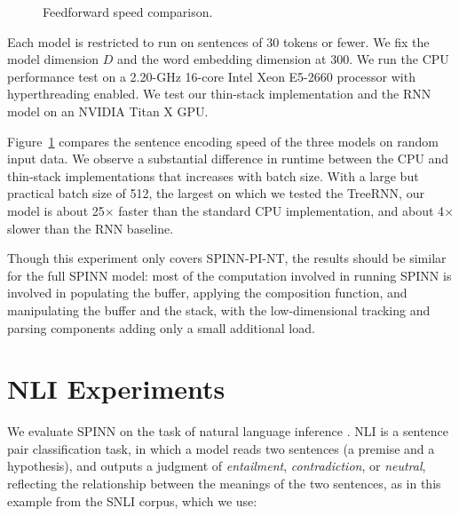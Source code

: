 \documentclass[11pt]{article}
\begin{document}
\begin{figure}
\centering
{}
\caption{Feedforward speed comparison.}
\label{fig:speed}
\end{figure}


Each model is restricted to run on sentences of 30 tokens or fewer. We fix the model dimension $D$ and the word embedding dimension at 300. We run the CPU performance test on a 2.20-GHz 16-core Intel Xeon E5-2660 processor with hyperthreading enabled. We test our thin-stack implementation and the RNN model on an NVIDIA Titan X GPU.

Figure~\ref{fig:speed} compares the sentence encoding speed of the three models on random input data. We observe a substantial difference in runtime between the CPU and thin-stack implementations that increases with batch size. With a large but practical batch size of 512, the largest on which we tested the TreeRNN, our model is about 25$\times$ faster than the standard CPU implementation, and about 4$\times$ slower than the RNN baseline.

Though this experiment only covers SPINN-PI-NT, the results should be similar for the full SPINN model: most of the computation involved in running SPINN is involved in populating the buffer, applying the composition function, and manipulating the buffer and the stack, with the low-dimensional tracking and parsing components adding only a small additional load.

\section{NLI Experiments}

We evaluate SPINN on the task of natural language inference \citep[NLI, a.k.a.\ recognizing textual entailment, or RTE;][]{dagan2006pascal}. NLI is a sentence pair classification task, in which a model reads two sentences (a premise and a hypothesis), and outputs a judgment of {\it entailment}, {\it contradiction}, or {\it neutral}, reflecting the relationship between the meanings of the two sentences, as in this example from the SNLI corpus, which we use:
\end{document}

